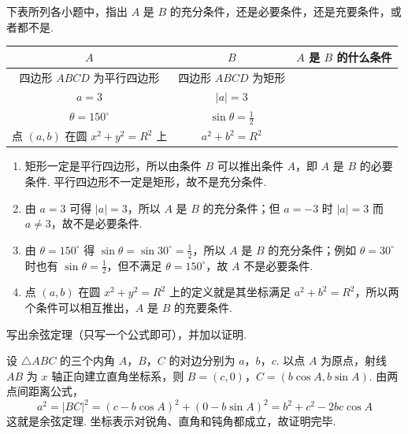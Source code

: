 \begin{problem}
下表所列各小题中，指出 \(A\) 是 \(B\) 的充分条件，还是必要条件，还是充要条件，或者都不是.

\begin{center}
\renewcommand{\arraystretch}{1.25}
\setlength{\tabcolsep}{8pt}
\begin{tabular}{|c|c|c|}
\hline
\(A\) & \(B\) & \(A\) 是 \(B\) 的什么条件 \\
\hline
四边形 \(ABCD\) 为平行四边形 & 四边形 \(ABCD\) 为矩形 & \\
\hline
\(a=3\) & \(|a|=3\) & \\
\hline
\(\theta=150^\circ\) & \(\sin\theta=\frac{1}{2}\) & \\
\hline
点 \((a,b)\) 在圆 \(x^{2}+y^{2}=R^{2}\) 上 & \(a^{2}+b^{2}=R^{2}\) & \\
\hline
\end{tabular}
\end{center}
\end{problem}

\begin{solution}
\begin{enumerate}
\item 矩形一定是平行四边形，所以由条件 \(B\) 可以推出条件 \(A\)，即 \(A\) 是 \(B\) 的必要条件. 平行四边形不一定是矩形，故不是充分条件.
\item 由 \(a=3\) 可得 \(|a|=3\)，所以 \(A\) 是 \(B\) 的充分条件；但 \(a=-3\) 时 \(|a|=3\) 而 \(a\ne3\)，故不是必要条件.
\item 由 \(\theta=150^\circ\) 得 \(\sin\theta=\sin30^\circ=\frac{1}{2}\)，所以 \(A\) 是 \(B\) 的充分条件；例如 \(\theta=30^\circ\) 时也有 \(\sin\theta=\frac{1}{2}\)，但不满足 \(\theta=150^\circ\)，故 \(A\) 不是必要条件.
\item 点 \((a,b)\) 在圆 \(x^2+y^2=R^2\) 上的定义就是其坐标满足 \(a^2+b^2=R^2\)，所以两个条件可以相互推出，\(A\) 是 \(B\) 的充要条件.
\end{enumerate}
\end{solution}

\begin{problem}
写出余弦定理（只写一个公式即可），并加以证明.
\end{problem}

\begin{solution}
设 \(\triangle ABC\) 的三个内角 \(A\)，\(B\)，\(C\) 的对边分别为 \(a\)，\(b\)，\(c\). 以点 \(A\) 为原点，射线 \(AB\) 为 \(x\) 轴正向建立直角坐标系，则
\(B=(c,0)\)，\(C=(b\cos A,b\sin A)\). 由两点间距离公式，
\[
a^2=|BC|^2=(c-b\cos A)^2+(0-b\sin A)^2=b^2+c^2-2bc\cos A
\]
这就是余弦定理. 坐标表示对锐角、直角和钝角都成立，故证明完毕.
\end{solution}


